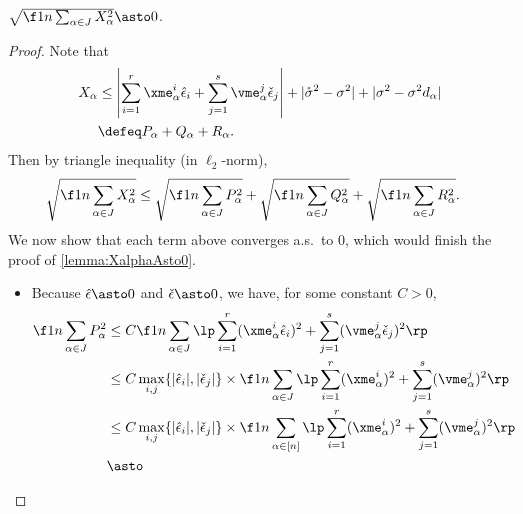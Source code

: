 \documentclass[main.tex]{subfiles}
\begin{document}
\begin{lemma}\label{lemma:XalphaAsto0}
$\sqrt{\f 1 n \sum_{\alpha \in \JJc} X_\alpha^2} \asto 0$.
\end{lemma}
\begin{proof}
    Note that
    \begin{align*}
    X_\alpha
        &\le
            \left|\sum_{i=1}^r \xme_\alpha^i \hat \epsilon_i
                    + \sum_{j=1}^s \vme_\alpha^j \check \epsilon_j
            \right|
            + |\mathring \sigma^2 - \sigma^2|
            + |\sigma^2 - \sigma^2 d_\alpha|
            \\
        &\defeq
            P_\alpha + Q_\alpha + R_\alpha
            .
    \end{align*}
    Then by triangle inequality (in $\ell_2$-norm),
    \begin{align*}
    \sqrt{\f 1 n \sum_{\alpha \in \JJc} X_\alpha^2}
        &\le
            \sqrt{\f 1 n \sum_{\alpha \in \JJc} P_\alpha^2}
            + \sqrt{\f 1 n \sum_{\alpha \in \JJc} Q_\alpha^2}
            + \sqrt{\f 1 n \sum_{\alpha \in \JJc} R_\alpha^2}
            .
    \end{align*}
    We now show that each term above converges a.s.\ to 0, which would finish the proof of \cref{lemma:XalphaAsto0}.
    \begin{itemize}
    \item
        Because $\hat \epsilon \asto 0$ and $\check \epsilon \asto 0$, we have, for some constant $C > 0$,
        \begin{align*}
        \f 1 n \sum_{\alpha \in \JJc} P_\alpha^2
            &\le
                C \f 1 n \sum_{\alpha \in \JJc} \lp
                    \sum_{i=1}^r (\xme_\alpha^i \hat \epsilon_i)^2
                    + \sum_{j=1}^s (\vme_\alpha^j \check \epsilon_j)^2
                    \rp
                \\
            &\le
                C \max_{i,j}\{|\hat \epsilon_i|, |\check \epsilon_j|\} \times 
                \f 1 n \sum_{\alpha \in \JJc} \lp
                    \sum_{i=1}^r (\xme_\alpha^i)^2
                    + \sum_{j=1}^s (\vme_\alpha^j)^2
                    \rp
                \\
            &\le
                C \max_{i,j}\{|\hat \epsilon_i|, |\check \epsilon_j|\} \times 
                \f 1 n \sum_{\alpha \in [n]} \lp
                    \sum_{i=1}^r (\xme_\alpha^i)^2
                    + \sum_{j=1}^s (\vme_\alpha^j)^2
                    \rp
                \\
            &\asto

\end{align*}
\end{itemize}
\end{proof}
\end{document}
